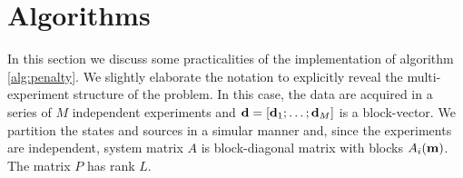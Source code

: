 \documentclass{iopart}
\begin{document}

\section{Algorithms}
\label{algorithm}
In this section we discuss some practicalities of the implementation of algorithm \ref{alg:penalty}. 
We slightly elaborate the notation to explicitly 
reveal the multi-experiment structure of the problem. In this case, the data are acquired in a series
of $M$ independent experiments and $\mathbf{d} = [\mathbf{d}_1; \ldots; \mathbf{d}_{M}]$ is a block-vector. We 
partition the states and sources in a simular manner and, since the experiments are independent, 
system matrix $A$ is block-diagonal matrix with blocks $A_i(\mathbf{m})$. The matrix $P$ has rank $L$.
\end{document}
